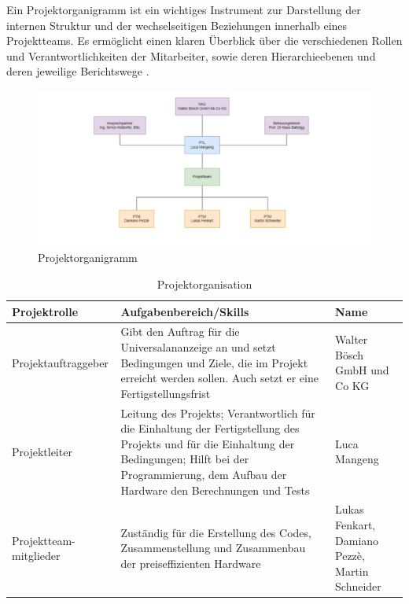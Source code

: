 Ein Projektorganigramm ist ein wichtiges Instrument zur Darstellung der internen Struktur und der wechselseitigen Beziehungen innerhalb eines Projektteams. Es ermöglicht einen klaren Überblick über die verschiedenen Rollen und Verantwortlichkeiten der Mitarbeiter, sowie deren Hierarchieebenen und deren jeweilige Berichtswege \cite{projektmanagement-definitionen:2009}.

\begin{figure}[H]
	\centering
	\includegraphics[width=0.9\linewidth]{Bilder/Organigramm}
	\caption{Projektorganigramm}
	\label{fig:organigramm}
\end{figure}

\begin{table}[H]
	\caption{Projektorganisation}
	\label{tab:projektorganisation}
	\begin{tabular}{p{} | p{} | p{}}
		\toprule
		\textbf{Projektrolle} & \textbf{Aufgabenbereich/Skills} & \textbf{Name} \\
		\midrule
		Projektauftraggeber & Gibt den Auftrag für die Universalananzeige an und setzt Bedingungen und Ziele, die im Projekt erreicht werden sollen. Auch setzt er eine Fertigstellungsfrist & Walter Bösch GmbH und Co KG
		\\
		\midrule
		Projektleiter & Leitung des Projekts;
		Verantwortlich für die Einhaltung der Fertigstellung des Projekts und für die Einhaltung der Bedingungen; Hilft bei der Programmierung, dem Aufbau der Hardware den Berechnungen und Tests
		 & Luca Mangeng
		\\
		\midrule
		Projektteam-mitglieder & Zuständig für die Erstellung des Codes, Zusammenstellung und Zusammenbau der preiseffizienten Hardware & 
		Lukas Fenkart, Damiano Pezzè, Martin Schneider
		\\
		\bottomrule
	\end{tabular}
\end{table}